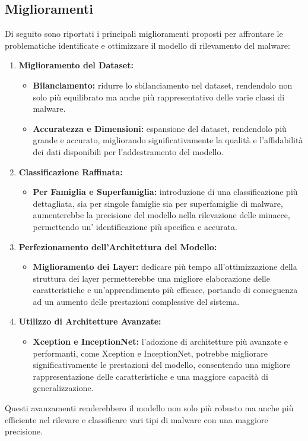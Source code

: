 \subsection{Miglioramenti}
Di seguito sono riportati i principali miglioramenti proposti per affrontare le problematiche identificate e ottimizzare il modello di rilevamento del malware:
\begin{enumerate}
    \item \textbf{Miglioramento del Dataset:}
      \begin{itemize}
        \item \textbf{Bilanciamento:} ridurre lo sbilanciamento nel dataset, rendendolo non solo più equilibrato ma anche più rappresentativo delle varie classi di malware.
        \item \textbf{Accuratezza e Dimensioni:} espansione del dataset, rendendolo più grande e accurato, migliorando significativamente la qualità e l'affidabilità dei dati disponibili per l'addestramento del modello.
      \end{itemize}
  
    \item \textbf{Classificazione Raffinata:}
      \begin{itemize}
        \item \textbf{Per Famiglia e Superfamiglia:} introduzione di una classificazione più dettagliata, sia per singole famiglie sia per superfamiglie di malware, aumenterebbe la precisione del modello nella rilevazione delle minacce, permettendo un' identificazione più specifica e accurata.
      \end{itemize}
  
    \item \textbf{Perfezionamento dell'Architettura del Modello:}
      \begin{itemize}
        \item \textbf{Miglioramento dei Layer:} dedicare più tempo all'ottimizzazione della struttura dei layer permetterebbe una migliore elaborazione delle caratteristiche e un'apprendimento più efficace, portando di conseguenza ad un aumento delle prestazioni complessive del sistema.
      \end{itemize}

    \item \textbf{Utilizzo di Architetture Avanzate:}
      \begin{itemize}
        \item \textbf{Xception e InceptionNet:} l'adozione di architetture più avanzate e performanti, come Xception e InceptionNet, potrebbe migliorare significativamente le prestazioni del modello, consentendo una migliore rappresentazione delle caratteristiche e una maggiore capacità di generalizzazione.
      \end{itemize}
  \end{enumerate}
  
Questi avanzamenti renderebbero il modello non solo più robusto ma anche più efficiente nel rilevare e classificare vari tipi di malware con una maggiore precisione.
  